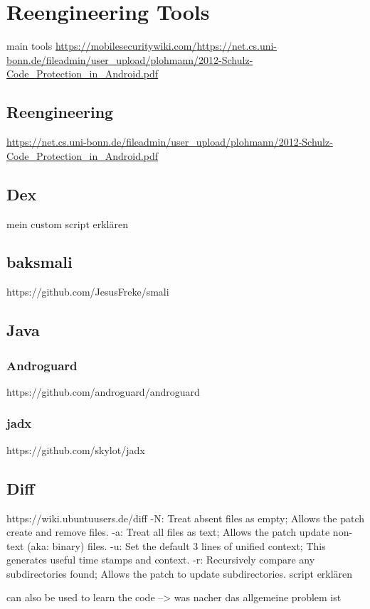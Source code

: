 \section{Reengineering Tools}\label{section:tools}
main tools\newline
\url{https://mobilesecuritywiki.com/}\newline \url{https://net.cs.uni-bonn.de/fileadmin/user_upload/plohmann/2012-Schulz-Code_Protection_in_Android.pdf}\newline
\subsection{Reengineering}\label{subsection}
\url{https://net.cs.uni-bonn.de/fileadmin/user_upload/plohmann/2012-Schulz-Code_Protection_in_Android.pdf}\newline
\subsection{Dex}\label{subsection:tools-dex}
mein custom script erklären

\subsection{baksmali}\label{subsection:tools-baksmali}
https://github.com/JesusFreke/smali

\subsection{Java}\label{subsection:tools-java}
\subsubsection{Androguard}\label{subsection:tools-java-androguard}
https://github.com/androguard/androguard
\subsubsection{jadx}\label{subsection:tools-java-jadx}
https://github.com/skylot/jadx


\subsection{Diff}\label{subsection:tools-diff}
https://wiki.ubuntuusers.de/diff\newline
-N: Treat absent files as empty; Allows the patch create and remove files.\newline
-a: Treat all files as text; Allows the patch update non-text (aka: binary) files.\newline
-u: Set the default 3 lines of unified context; This generates useful time stamps and context.\newline
-r: Recursively compare any subdirectories found; Allows the patch to update subdirectories.\newline
script erklären\newline




can also be used to learn the code --> was nacher das allgemeine problem ist\newline
